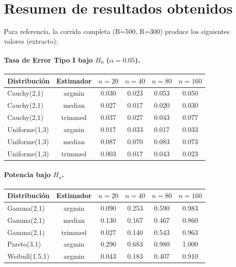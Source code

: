 \documentclass[11pt,a4paper]{article}
\begin{document}
\section{Resumen de resultados obtenidos}

Para referencia, la corrida completa (B=500, R=300) produce los siguientes valores (extracto):

\paragraph{Tasa de Error Tipo I bajo $H_0$ ($\alpha = 0.05$).}
\begin{center}
\small
\begin{tabular}{@{}lccccc@{}}
\toprule
Distribución & Estimador & $n=20$ & $n=40$ & $n=80$ & $n=160$ \\
\midrule
Cauchy(2,1)  & argmin  & 0.030 & 0.023 & 0.053 & 0.050 \\
Cauchy(2,1)  & median  & 0.027 & 0.017 & 0.020 & 0.030 \\
Cauchy(2,1)  & trimmed & 0.037 & 0.027 & 0.043 & 0.077 \\
Uniforme(1,3) & argmin  & 0.017 & 0.033 & 0.017 & 0.033 \\
Uniforme(1,3) & median  & 0.087 & 0.070 & 0.083 & 0.073 \\
Uniforme(1,3) & trimmed & 0.003 & 0.017 & 0.043 & 0.023 \\
\bottomrule
\end{tabular}
\end{center}

\paragraph{Potencia bajo $H_a$.}
\begin{center}
\small
\begin{tabular}{@{}lccccc@{}}
\toprule
Distribución & Estimador & $n=20$ & $n=40$ & $n=80$ & $n=160$ \\
\midrule
Gamma(2,1)     & argmin  & 0.090 & 0.253 & 0.590 & 0.983 \\
Gamma(2,1)     & median  & 0.130 & 0.167 & 0.467 & 0.860 \\
Gamma(2,1)     & trimmed & 0.027 & 0.140 & 0.543 & 0.963 \\
Pareto(3,1)    & argmin  & 0.290 & 0.683 & 0.980 & 1.000 \\
Weibull(1.5,1) & argmin  & 0.043 & 0.183 & 0.407 & 0.910 \\
\bottomrule
\end{tabular}
\end{center}
\end{document}
